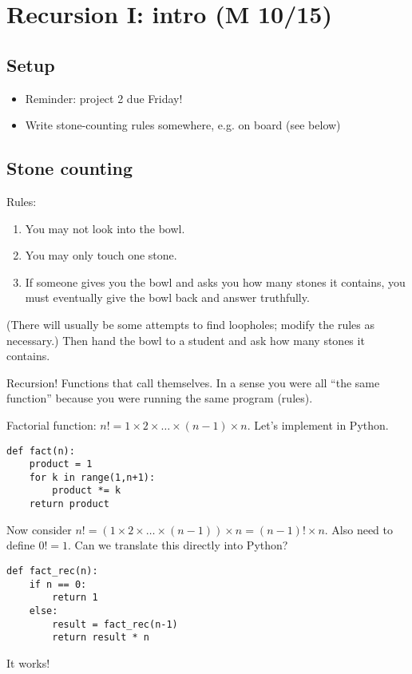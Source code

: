\documentclass{article}
\newcommand{\eg}{\emph{e.g.}\xspace}
\newenvironment{reflect}[1]
{
  \noindent
  \begin{lrbox}{\reflectbox}
    \begin{minipage}[t]{\textwidth}
      \textbf{#1}:
}{
    \end{minipage}
  \end{lrbox}
  \fbox{\usebox{\reflectbox}}
}
\begin{document}

\newpage
\section{Recursion I: intro (M 10/15)}

\subsection*{Setup}
\begin{itemize}
\item Reminder: project 2 due Friday!
\item Write stone-counting rules somewhere, e.g. on board (see below)
\end{itemize}

\subsection*{Stone counting}

Rules:
\begin{enumerate}
\item You may not look into the bowl.
\item You may only touch one stone.
\item If someone gives you the bowl and asks you how many stones it
  contains, you must eventually give the bowl back and answer
  truthfully.
\end{enumerate}
(There will usually be some attempts to find loopholes; modify the
rules as necessary.)  Then hand the bowl to a student and ask how many
stones it contains.

Recursion!  Functions that call themselves.  In a sense you were all
``the same function'' because you were running the same program
(rules).

Factorial function: $n! = 1 \times 2 \times \dots \times (n-1) \times
n$.  Let's implement in Python.
\begin{verbatim}
def fact(n):
    product = 1
    for k in range(1,n+1):
        product *= k
    return product
\end{verbatim}
Now consider $n! = (1 \times 2 \times \dots \times (n-1)) \times n =
(n-1)! \times n$.  Also need to define $0! = 1$.  Can we translate
this directly into Python?
\begin{verbatim}
def fact_rec(n):
    if n == 0:
        return 1
    else:
        result = fact_rec(n-1)
        return result * n
\end{verbatim}
It works!
\end{document}
